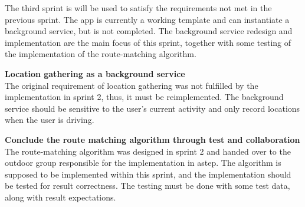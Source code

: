 The third sprint is will be used to satisfy the requirements not met in the previous sprint.
The app is currently a working template and can instantiate a background service, but is not completed. 
The background service redesign and implementation are the main focus of this sprint, together with some testing of the implementation of the route-matching algorithm.

\textbf{Location gathering as a background service}\\
The original requirement of location gathering was not fulfilled by the implementation in sprint 2, thus, it must be reimplemented.
The background service should be sensitive to the user's current activity and only record locations when the user is driving.

\textbf{Conclude the route matching algorithm through test and collaboration}\\
The route-matching algorithm was designed in sprint 2 and handed over to the outdoor group responsible for the implementation in \gls{astep}.
The algorithm is supposed to be implemented within this sprint, and the implementation should be tested for result correctness.
The testing must be done with some test data, along with result expectations.